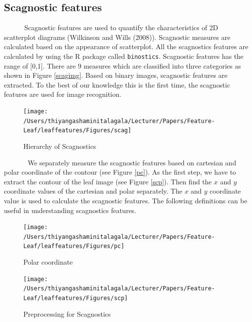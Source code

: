 \documentclass{article}
\begin{document}
\hypertarget{scagnostic-features}{%
\subsection{Scagnostic features}\label{scagnostic-features}}

~~~~~~Scagnostic features are used to quantify the characteristics of 2D
scatterplot diagrams (Wilkinson and Wills (2008)). Scagnostic measures
are calculated based on the appearance of scatterplot. All the
scagnostics features are calculated by using the R package called
\texttt{binostics}. Scagnostic features has the range of {[}0,1{]}.
There are 9 measures which are classified into three categories as shown
in Figure \ref{scagimg}. Based on binary images, scagnostic features are
extracted. To the best of our knowledge this is the first time, the
scagnostic features are used for image recognition.

\begin{figure}[!ht]

{\centering \texttt{[image: /Users/thiyangashaminitalagala/Lecturer/Papers/Feature-Leaf/leaffeatures/Figures/scag]} 

}

\caption{\label{scagimg}Hierarchy of Scagnostics}\label{fig:unnamed-chunk-28}
\end{figure}

~~~~~~~We separately measure the scagnostic features based on cartesian
and polar coordinate of the contour (see Figure \ref{pc}). As the first
step, we have to extract the contour of the leaf image (see Figure
\ref{scp}). Then find the \(x\) and \(y\) coordinate values of the
cartesian and polar separately. The \(x\) and \(y\) coordinate value is
used to calculate the scagnostic features. The following definitions can
be useful in understanding scagnostics features.

\begin{figure}[!ht]

{\centering \texttt{[image: /Users/thiyangashaminitalagala/Lecturer/Papers/Feature-Leaf/leaffeatures/Figures/pc]} 

}

\caption{\label{pc}Polar coordinate}\label{fig:unnamed-chunk-29}
\end{figure}

\begin{figure}[!ht]

{\centering \texttt{[image: /Users/thiyangashaminitalagala/Lecturer/Papers/Feature-Leaf/leaffeatures/Figures/scp]} 

}

\caption{\label{scp}Preprocessing for Scagnostics}\label{fig:unnamed-chunk-30}
\end{figure}
\end{document}
